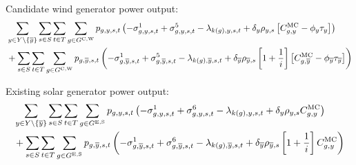\documentclass{article}
\begin{document}
Candidate wind generator power output:
\begin{align}
	& \sum\limits_{\iYear \in \sYears 
		\setminus \{\iYearTerminal\}
	}\sum\limits_{\iScenario \in \sScenarios}\sum\limits_{\iInterval \in \sIntervals} \sum\limits_{\iGenerator \in \sGeneratorsCandidateWind} \vPower\left(-\dMinPowerOutput + \dMaxPowerOutputWindCandidate 
	- \dPowerBalance[k(\iGenerator),\iYear,\iScenario,\iInterval] + \cDiscountRate \cScenarioDuration \left[\cMarginalCost - \vBaseline\vPermitPrice \right]
	\right) \nonumber\\
	& + \sum\limits_{\iScenario \in \sScenarios} \sum\limits_{\iInterval \in \sIntervals} \sum\limits_{\iGenerator \in \sGeneratorsCandidateWind} \vPower[\iGenerator,\iYearTerminal,\iScenario,\iInterval] \left(-\dMinPowerOutput[\iGenerator,\iYearTerminal,\iScenario,\iInterval] + \dMaxPowerOutputWindCandidate[\iGenerator,\iYearTerminal,\iScenario,\iInterval] - \dPowerBalance[k(\iGenerator),\iYearTerminal,\iScenario,\iInterval] + \cDiscountRate[\iYearTerminal] \cScenarioDuration[\iYearTerminal,\iScenario] \left[1 + \frac{1}{\cInterestRate}\right] \left[\cMarginalCost[\iGenerator,\iYearTerminal] - \vBaseline[\iYearTerminal]\vPermitPrice[\iYearTerminal] \right] \right)\nonumber\\
\end{align}

Existing solar generator power output:
\begin{align}
	& \sum\limits_{\iYear \in \sYears 
		\setminus \{\iYearTerminal\}
	}\sum\limits_{\iScenario \in \sScenarios}\sum\limits_{\iInterval \in \sIntervals} \sum\limits_{\iGenerator \in \sGeneratorsExistingSolar} \vPower\left(-\dMinPowerOutput + \dMaxPowerOutputSolarExisting 
	- \dPowerBalance[k(\iGenerator),\iYear,\iScenario,\iInterval] + \cDiscountRate \cScenarioDuration\cMarginalCost
	\right) \nonumber\\
	& + \sum\limits_{\iScenario \in \sScenarios} \sum\limits_{\iInterval \in \sIntervals} \sum\limits_{\iGenerator \in \sGeneratorsExistingSolar} \vPower[\iGenerator,\iYearTerminal,\iScenario,\iInterval] \left(-\dMinPowerOutput[\iGenerator,\iYearTerminal,\iScenario,\iInterval] + \dMaxPowerOutputSolarExisting[\iGenerator,\iYearTerminal,\iScenario,\iInterval] - \dPowerBalance[k(\iGenerator),\iYearTerminal,\iScenario,\iInterval] + \cDiscountRate[\iYearTerminal] \cScenarioDuration[\iYearTerminal,\iScenario] \left[1 + \frac{1}{\cInterestRate}\right] \cMarginalCost \right)\\
\end{align}
\end{document}
